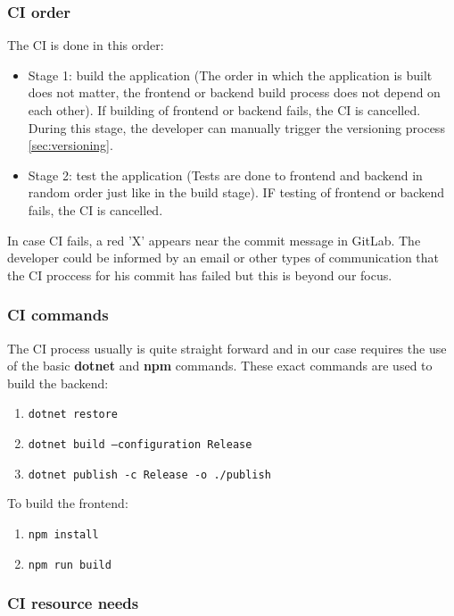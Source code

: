 \documentclass[]{VUMIFTemplateClass}
\begin{document}
\subsubsection{CI order}
The CI is done in this order:
\begin{itemize}
    \item Stage 1: build the application (The order in which the application is built does not matter, the frontend or backend build process does not depend on each other).
    If building of frontend or backend fails, the CI is cancelled. \\ During this stage, the developer can manually trigger the versioning process \ref{sec:versioning}.
    \item Stage 2: test the application (Tests are done to frontend and backend in random order just like in the build stage).
    IF testing of frontend or backend fails, the CI is cancelled.
\end{itemize}

In case CI fails, a red 'X' appears near the commit message in GitLab.
The developer could be informed by an email or other types of communication that the CI proccess for his commit has failed but this is beyond our 
focus.

\subsubsection{CI commands}
The CI process usually is quite straight forward and in our case requires the use
of the basic \textbf{dotnet} and \textbf{npm} commands. These exact commands are used to build the backend:
\begin{enumerate}
    \item \texttt{dotnet restore}
    \item \texttt{dotnet build --configuration Release}
    \item \texttt{dotnet publish -c Release -o ./publish}
\end{enumerate} 
To build the frontend:
\begin{enumerate}
    \item \texttt{npm install}
    \item \texttt{npm run build}
\end{enumerate}

\subsubsection{CI resource needs}
\end{document}
